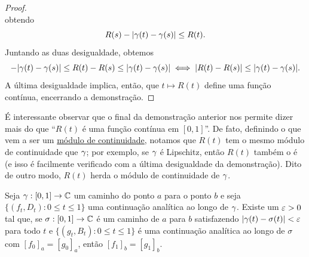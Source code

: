 \begin{proof}
\begin{equation*}
        \end{equation*}
        obtendo
        \begin{equation*}
            R(s) - |\gamma(t) - \gamma(s)| \leq R(t).
        \end{equation*}
        Juntando as duas desigualdade, obtemos
        \begin{equation*}
            -|\gamma(t) - \gamma(s)| \leq R(t) - R(s) \leq |\gamma(t) - \gamma(s)| 
            \iff
            |R(t) - R(s)| \leq |\gamma(t) - \gamma(s)|.
        \end{equation*}
        A última desigualdade implica, então, que $t\mapsto R(t)$ define uma função contínua,
        encerrando a demonstração.
    \end{proof}

    É interessante observar que o final da demonstração anterior nos permite dizer
    mais do que ``$R(t)$ é uma função contínua em $[0,1]$''. De fato, definindo o que
    vem a ser um 
    \href{%
        https://en.wikipedia.org/wiki/Modulus_of_continuity
    }{módulo de continuidade},
    notamos que $R(t)$ tem o mesmo módulo de continuidade que $\gamma$; por exemplo, se
    $\gamma$ é Lipschitz, então $R(t)$ também o é 
    (e isso é facilmente verificado com a última desigualdade da demonstração).
    Dito de outro modo, $R(t)$ herda o módulo de continuidade de $\gamma$.

    \begin{lema}
    \label{lema-ext-epsilon-proximas}
        Seja $\gamma: [0,1] \to \mathbb{C}$ um caminho do ponto $a$ para o ponto $b$ e seja
        $\{(f_t, D_t): 0 \leq t \leq 1\}$ uma continuação analítica ao longo de $\gamma$. 
        Existe um $\varepsilon > 0$ tal que, se $\sigma :[0,1] \to \mathbb{C}$ é um caminho 
        de $a$ para $b$ satisfazendo $|\gamma(t) - \sigma(t)| < \varepsilon$ para todo $t$ 
        e $\{(g_t, B_t): 0 \leq t \leq 1\}$ é uma continuação analítica ao longo de $\sigma$ 
        com $[f_0]_a = [g_0]_a$, então $[f_1]_b = [g_1]_b$.
    \end{lema}

